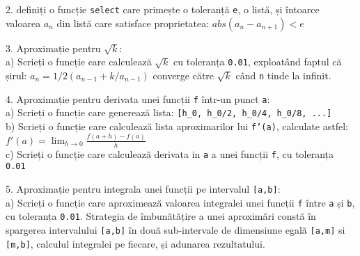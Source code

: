 2. definiți o funcție \texttt{select} care primește o toleranță \texttt{e}, o listă, și întoarce valoarea $a_n$ din listă care satisface proprietatea: $abs(a_n - a_{n+1}) < e$

3. Aproximație pentru $\sqrt{k}$:\\ a) Scrieți o funcție care calculează $\sqrt{k}$ cu toleranța \texttt{0.01}, exploatând faptul că șirul: $a_n = 1/2(a_{n-1} + k/a_{n-1})$ converge către $\sqrt{k}$ când \texttt{n} tinde la infinit.
      
4. Aproximație pentru derivata unei funcții \texttt{f} într-un punct \texttt{a}:\\ a) Scrieți o funcție care generează lista: \texttt{[h\_0, h\_0/2, h\_0/4, h\_0/8, ...]}\\ b) Scrieți o funcție care calculează lista aproximarilor lui \texttt{f'(a)}, calculate astfel: $\displaystyle f'(a)=\lim_{h \rightarrow 0} \frac{f(a+h)-f(a)}{h}$\\ c) Scrieți o funcție care calculează derivata in \texttt{a} a unei funcții \texttt{f}, cu toleranța \texttt{0.01}

5. Aproximație pentru integrala unei funcții pe intervalul \texttt{[a,b]}:\\ a) Scrieți o funcție care aproximează valoarea integralei unei funcții \texttt{f} între \texttt{a} și \texttt{b}, cu toleranța \texttt{0.01}. Strategia de îmbunătățire a unei aproximări constă în spargerea intervalului \texttt{[a,b]} în două sub-intervale de dimensiune egală \texttt{[a,m]} si \texttt{[m,b]}, calculul integralei pe fiecare, și adunarea rezultatului.
